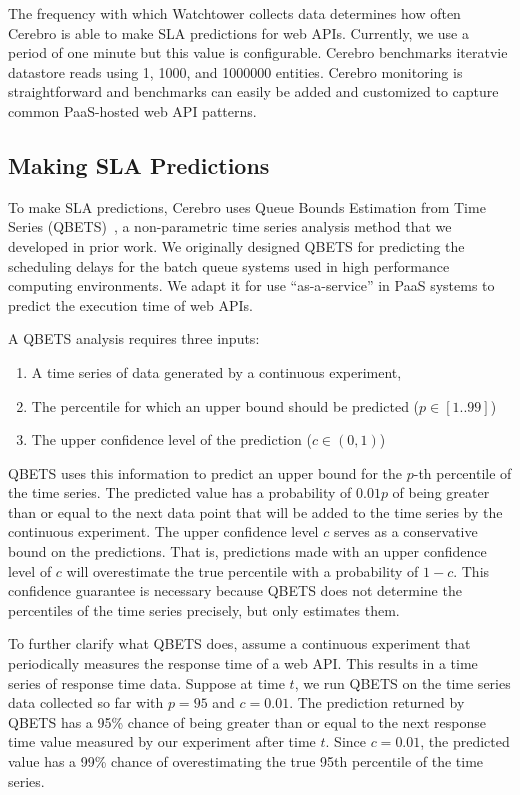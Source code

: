 The frequency with which
Watchtower collects data determines how often Cerebro 
is able to make SLA predictions for web APIs. Currently, we use a period of one minute
but this value is configurable.  Cerebro benchmarks iteratvie datastore reads
using 1, 1000, and 1000000 entities.  Cerebro monitoring is straightforward and
benchmarks can easily be added and customized to capture common PaaS-hosted web API
patterns.


\subsection{Making SLA Predictions}

To make SLA predictions, Cerebro uses 
Queue Bounds Estimation from Time Series (QBETS)~\cite{Nurmi:2007:QQB:1791551.1791556},
a non-parametric time series analysis method that we developed in prior work.
We originally designed QBETS for
predicting the scheduling delays for the batch queue systems 
used in high performance computing environments. 
We adapt it for use ``as-a-service'' in PaaS systems 
to predict the execution time of web APIs.

A QBETS analysis requires three inputs:
\begin{enumerate}
\item A time series of data generated by a continuous experiment,
\item The percentile for which an upper bound should be predicted ($p \in [1..99]$)
\item The upper confidence level of the prediction ($c \in (0,1)$)
\end{enumerate}

QBETS uses this information to predict an upper bound for 
the $p$-th percentile of the time series.
The predicted value has a probability of $0.01p$ of 
being greater than or equal to the next data point that
will be added to the time series by the continuous experiment. 
The upper confidence level $c$ serves as a conservative
bound on the predictions. That is, predictions made with an upper confidence 
level of $c$ will overestimate
the true percentile with a probability of $1-c$. This confidence guarantee 
is necessary because 
QBETS does not determine the 
percentiles of the time series precisely, but only estimates them. 

To further clarify what QBETS does, assume a continuous experiment 
that periodically measures the
response time of a web API. This results in a time series of 
response time data. Suppose at time $t$,
we run QBETS on the time series data collected so far 
with $p=95$ and $c=0.01$. The prediction returned
by QBETS has a 95\% chance of being greater than or equal 
to the next response time value measured
by our experiment after time $t$. Since $c=0.01$, the predicted value has a 99\% chance of
overestimating the true 95th percentile of the time series.

